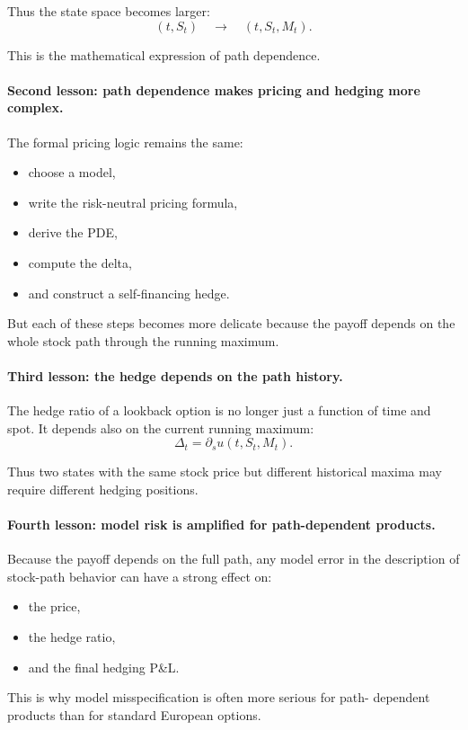 \documentclass[11pt]{article}
\theoremstyle{plain}
\theoremstyle{definition}
\theoremstyle{remark}
\begin{document}
Thus the state space becomes larger:
\[
(t,S_t)
\quad\longrightarrow\quad
(t,S_t,M_t).
\]

This is the mathematical expression of path dependence.

\paragraph{Second lesson: path dependence makes pricing and hedging more complex.}
The formal pricing logic remains the same:
\begin{itemize}[leftmargin=1.4em]
    \item choose a model,
    \item write the risk-neutral pricing formula,
    \item derive the PDE,
    \item compute the delta,
    \item and construct a self-financing hedge.
\end{itemize}

But each of these steps becomes more delicate because the payoff depends
on the whole stock path through the running maximum.

\paragraph{Third lesson: the hedge depends on the path history.}
The hedge ratio of a lookback option is no longer just a function of
time and spot.
It depends also on the current running maximum:
\[
\Delta_t=\partial_s u(t,S_t,M_t).
\]

Thus two states with the same stock price but different historical
maxima may require different hedging positions.

\paragraph{Fourth lesson: model risk is amplified for path-dependent products.}
Because the payoff depends on the full path, any model error in the
description of stock-path behavior can have a strong effect on:
\begin{itemize}[leftmargin=1.4em]
    \item the price,
    \item the hedge ratio,
    \item and the final hedging P\&L.
\end{itemize}

This is why model misspecification is often more serious for path-
dependent products than for standard European options.
\end{document}
